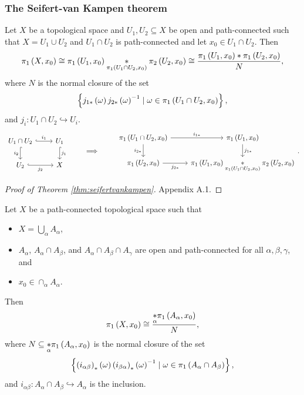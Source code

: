 \subsubsection{The Seifert-van Kampen theorem}

\begin{theorem}
\label{thm:seifertvankampen}
Let $ X $ be a topological space and $ U_1, U_2 \subseteq X $ be open and path-connected such that $ X = U_1 \cup U_2 $ and $ U_1 \cap U_2 $ is path-connected and let $ x_0 \in U_1 \cap U_2 $. Then
$$ \pi_1\left( X, x_0 \right) \cong \pi_1\left( U_1, x_0 \right) \underset{\pi_1\left( U_1 \cap U_2, x_0 \right)}{*} \pi_2\left( U_2, x_0 \right) \cong \dfrac{\pi_1\left( U_1, x_0 \right) * \pi_1\left( U_2, x_0 \right)}{N}, $$
where $ N $ is the normal closure of the set
$$ \left\{ j_{1*}\left( \omega \right)j_{2*}\left( \omega \right)^{-1} \mid \omega \in \pi_1\left( U_1 \cap U_2, x_0 \right) \right\}, $$
and $ j_i : U_1 \cap U_2 \hookrightarrow U_i $.
$$
\begin{tikzcd}
U_1 \cap U_2 \arrow[hookrightarrow]{r}{i_1} \arrow[hookrightarrow, swap]{d}{i_2} & U_1 \arrow[hookrightarrow]{d}{j_1} \\
U_2 \arrow[hookrightarrow, swap]{r}{j_2} & X
\end{tikzcd}
\qquad \implies \qquad
\begin{tikzcd}
\pi_1\rb{U_1 \cap U_2, x_0} \arrow{r}{i_{1*}} \arrow[swap]{d}{i_{2*}} & \pi_1\rb{U_1, x_0} \arrow{d}{j_{1*}} \\
\pi_1\rb{U_2, x_0} \arrow[swap]{r}{j_{2*}} & \pi_1\rb{U_1, x_0} \underset{\pi_1\rb{U_1 \cap U_2, x_0}}{*} \pi_2\rb{U_2, x_0}
\end{tikzcd}.
$$
\end{theorem}

\begin{proof}[Proof of Theorem \ref{thm:seifertvankampen}]
Appendix A.1.
\end{proof}

\pagebreak


\begin{theorem}
Let $ X $ be a path-connected topological space such that
\begin{itemize}
\item $ X = \bigcup_\alpha A_\alpha $,
\item $ A_\alpha $, $ A_\alpha \cap A_\beta $, and $ A_\alpha \cap A_\beta \cap A_\gamma $ are open and path-connected for all $ \alpha, \beta, \gamma $, and
\item $ x_0 \in \cap_\alpha A_\alpha $.
\end{itemize}
Then
$$ \pi_1\left( X, x_0 \right) \cong \dfrac{\underset{\alpha}{*} \pi_1\left( A_\alpha, x_0 \right)}{N}, $$
where $ N \subseteq \underset{\alpha}{*} \pi_1\left( A_\alpha, x_0 \right) $ is the normal closure of the set
$$ \left\{ \left( i_{\alpha\beta} \right)_*\left( \omega \right)\left( i_{\beta\alpha} \right)_*\left( \omega \right)^{-1} \mid \omega \in \pi_1\left( A_\alpha \cap A_\beta \right) \right\}, $$
and $ i_{\alpha\beta} : A_\alpha \cap A_\beta \hookrightarrow A_\alpha $ is the inclusion.
\end{theorem}


